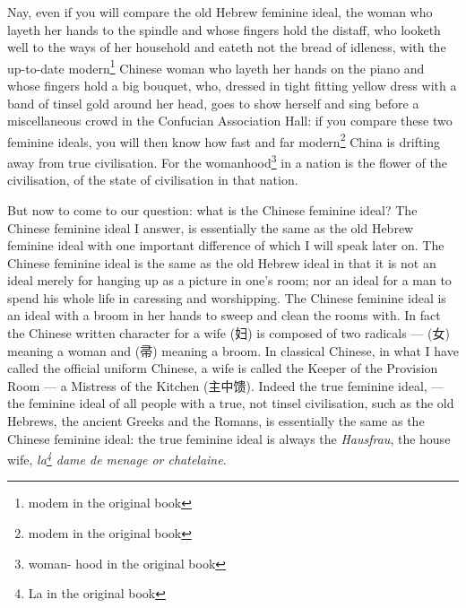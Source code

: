 Nay, even if you will compare the old Hebrew feminine ideal, the woman who layeth her hands to the spindle and whose fingers hold the distaff, who looketh well to the ways of her household and eateth not the bread of idleness, with the up-to-date modern\footnote{modem in the original book} Chinese woman who layeth her hands on the piano and whose fingers hold a big bouquet, who, dressed in tight fitting yellow dress with a band of tinsel gold around her head, goes to show herself and sing before a miscellaneous crowd in the Confucian Association Hall: if you compare these two feminine ideals, you will then know how fast and far modern\footnote{modem in the original book} China is drifting away from true civilisation.
For the womanhood\footnote{woman- hood in the original book} in a nation is the flower of the civilisation, of the state of civilisation in that nation.

But now to come to our question: what is the Chinese feminine ideal? 
The Chinese feminine ideal I answer, is essentially the same as the old Hebrew feminine ideal with one important difference of which I will speak later on.
The Chinese feminine ideal is the same as the old Hebrew ideal in that it is not an ideal merely for hanging up as a picture in one's room; nor an ideal for a man to spend his whole life in caressing and worshipping.
The Chinese feminine ideal is an ideal with a broom in her hands to sweep and clean the rooms with.
In fact the Chinese written character for a wife (妇) is composed of two radicals --- (女) meaning a woman and (帚) meaning a broom.
In classical Chinese, in what I have called the official uniform Chinese, a wife is called the Keeper of the Provision Room --- a Mistress of the Kitchen (主中馈).
Indeed the true feminine ideal, --- the feminine ideal of all people with a true, not tinsel civilisation, such as the old Hebrews, the ancient Greeks and the Romans, is essentially the same as the Chinese feminine ideal: the true feminine ideal is always the \emph{Hausfrau}, the house wife, \emph{la\footnote{La in the original book} dame de menage or chatelaine}.

